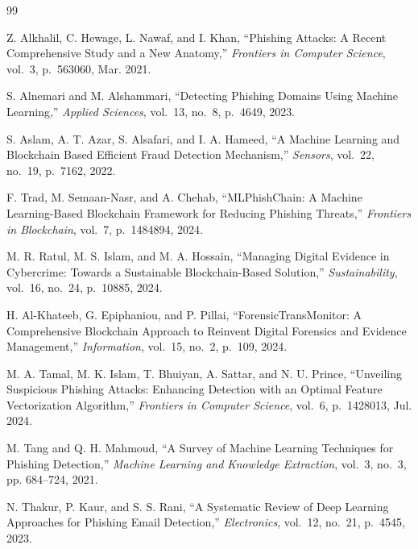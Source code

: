 \documentclass[conference]{IEEEtran}
\begin{document}
\begin{thebibliography}{99}

Z. Alkhalil, C. Hewage, L. Nawaf, and I. Khan, ``Phishing Attacks: A Recent Comprehensive Study and a New Anatomy,'' \textit{Frontiers in Computer Science}, vol.~3, p.~563060, Mar. 2021.

S. Alnemari and M. Alshammari, ``Detecting Phishing Domains Using Machine Learning,'' \textit{Applied Sciences}, vol.~13, no.~8, p.~4649, 2023.

S. Aslam, A. T. Azar, S. Alsafari, and I. A. Hameed, ``A Machine Learning and Blockchain Based Efficient Fraud Detection Mechanism,'' \textit{Sensors}, vol.~22, no.~19, p.~7162, 2022.

F. Trad, M. Semaan-Nasr, and A. Chehab, ``MLPhishChain: A Machine Learning-Based Blockchain Framework for Reducing Phishing Threats,'' \textit{Frontiers in Blockchain}, vol.~7, p.~1484894, 2024.

M. R. Ratul, M. S. Islam, and M. A. Hossain, ``Managing Digital Evidence in Cybercrime: Towards a Sustainable Blockchain-Based Solution,'' \textit{Sustainability}, vol.~16, no.~24, p.~10885, 2024.

H. Al-Khateeb, G. Epiphaniou, and P. Pillai, ``ForensicTransMonitor: A Comprehensive Blockchain Approach to Reinvent Digital Forensics and Evidence Management,'' \textit{Information}, vol.~15, no.~2, p.~109, 2024.

M. A. Tamal, M. K. Islam, T. Bhuiyan, A. Sattar, and N. U. Prince, ``Unveiling Suspicious Phishing Attacks: Enhancing Detection with an Optimal Feature Vectorization Algorithm,'' \textit{Frontiers in Computer Science}, vol.~6, p.~1428013, Jul. 2024.

M. Tang and Q. H. Mahmoud, ``A Survey of Machine Learning Techniques for Phishing Detection,'' \textit{Machine Learning and Knowledge Extraction}, vol.~3, no.~3, pp. 684–724, 2021.

N. Thakur, P. Kaur, and S. S. Rani, ``A Systematic Review of Deep Learning Approaches for Phishing Email Detection,'' \textit{Electronics}, vol.~12, no.~21, p.~4545, 2023.


\end{thebibliography}
\end{document}
